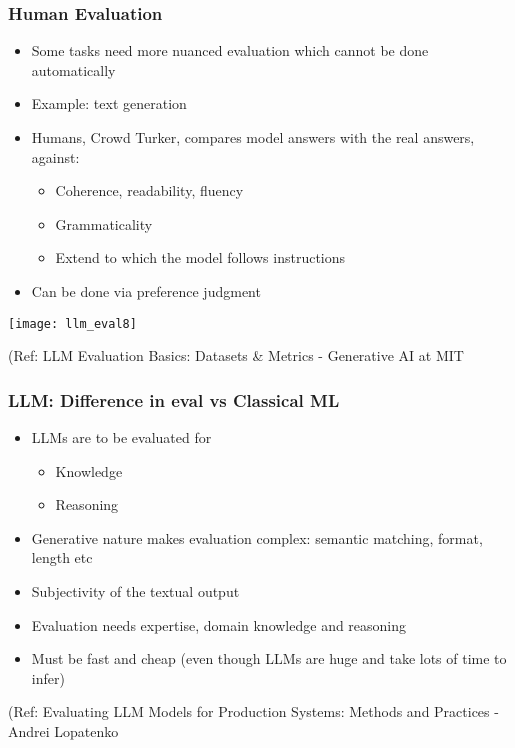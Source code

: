 \begin{frame}[fragile]\frametitle{Human Evaluation}

  \begin{itemize}
    \item Some tasks need more nuanced evaluation which cannot be done automatically
    \item Example: text generation
	\item Humans, Crowd Turker, compares model answers with the real answers, against:
      \begin{itemize}
        \item Coherence, readability, fluency
        \item Grammaticality
		\item Extend to which the model follows instructions
      \end{itemize}
	\item Can be done via preference judgment
  \end{itemize}
		
\begin{center}
\texttt{[image: llm\_eval8]}
\end{center}	
		
{\tiny (Ref: LLM Evaluation Basics: Datasets \& Metrics - Generative AI at MIT}
			
			
\end{frame}

\begin{frame}[fragile]\frametitle{LLM: Difference in eval vs Classical ML}

  \begin{itemize}
    \item LLMs are to be evaluated for
      \begin{itemize}
        \item Knowledge
		\item Reasoning
      \end{itemize}
	\item Generative nature makes evaluation complex: semantic matching, format, length etc
	\item Subjectivity of the textual output
	\item Evaluation needs expertise, domain knowledge and reasoning
	\item Must be fast and cheap (even though LLMs are huge and take lots of time to infer)
  \end{itemize}
		

{\tiny (Ref: Evaluating LLM Models for Production Systems: Methods and Practices - Andrei Lopatenko}
			
			
\end{frame}

